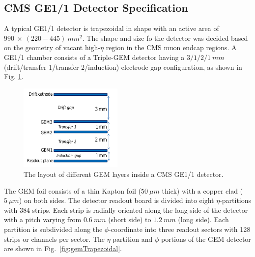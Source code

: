 \subsection{CMS GE1/1 Detector Specification} %
\label{sub:GE1/1_detector_details}
A typical GE1/1 detector is trapezoidal in shape with an active area of $990~\times~(220-445)~mm^2$.
The shape and size fo the detector was decided based on the geometry of vacant high-$\eta$ region in the CMS muon endcap regions.
A GE1/1 chamber consists of a Triple-GEM detector having a $3/1/2/1~mm$ (drift/transfer 1/transfer 2/induction) electrode gap configuration, as shown in Fig. \ref{fig:tripple-gem}.
\begin{figure}[!htbp]
    \begin{center}
        \includegraphics[width=0.45\textwidth]{figures/GEM/tripple-gem.png}
        \caption{The layout of different GEM layers inside a CMS GE1/1 detector.}
        \label{fig:tripple-gem}
    \end{center}
\end{figure} 
The GEM foil consists of a thin Kapton foil ($50~\mu m$ thick) with a copper clad ($5~\mu m$) on both sides.
The detector readout board is divided into eight $\eta$-partitions with 384 strips.
Each strip is radially oriented along the long side of the detector with a pitch varying from $0.6~mm$ (short side) to $1.2~mm$ (long side).
Each partition is subdivided along the $\phi$-coordinate into three readout sectors with 128 strips or channels per sector. The $\eta$ partition and $\phi$ portions of the GEM detector are shown in Fig.~\ref{fig:gemTrapezoidal}.
